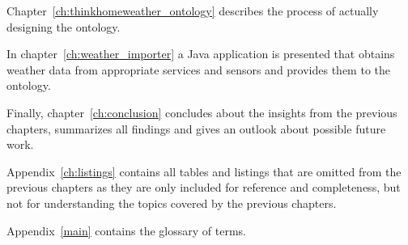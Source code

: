 Chapter~\ref{ch:thinkhomeweather_ontology} describes the process of actually designing the ontology.

In chapter~\ref{ch:weather_importer} a Java application is presented that obtains weather data from appropriate services and sensors and provides them to the \thinkhome ontology.

Finally, chapter~\ref{ch:conclusion} concludes about the insights from the previous chapters, summarizes all findings and gives an outlook about possible future work.

Appendix~\ref{ch:listings} contains all tables and listings that are omitted from the previous chapters as they are only included for reference and completeness, but not for understanding the topics covered by the previous chapters.

Appendix~\ref{main} contains the glossary of terms.
